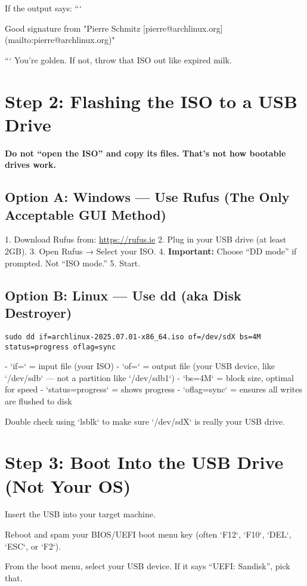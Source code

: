 \documentclass[12pt]{book}
\begin{document}
If the output says:
```

Good signature from "Pierre Schmitz [pierre@archlinux.org](mailto:pierre@archlinux.org)"

```
You're golden. If not, throw that ISO out like expired milk.

\section*{Step 2: Flashing the ISO to a USB Drive}

\textbf{Do not “open the ISO” and copy its files. That’s not how bootable drives work.}

\subsection*{Option A: Windows — Use Rufus (The Only Acceptable GUI Method)}

1. Download Rufus from: \url{https://rufus.ie}
2. Plug in your USB drive (at least 2GB).
3. Open Rufus → Select your ISO.
4. \textbf{Important:} Choose “DD mode” if prompted. Not “ISO mode.”
5. Start.

\subsection*{Option B: Linux — Use dd (aka Disk Destroyer)}

\begin{lstlisting}
sudo dd if=archlinux-2025.07.01-x86_64.iso of=/dev/sdX bs=4M status=progress oflag=sync
\end{lstlisting}

- `if=` = input file (your ISO)
- `of=` = output file (your USB device, like `/dev/sdb` — not a partition like `/dev/sdb1`)
- `bs=4M` = block size, optimal for speed
- `status=progress` = shows progress
- `oflag=sync` = ensures all writes are flushed to disk

Double check using `lsblk` to make sure `/dev/sdX` is really your USB drive.

\section*{Step 3: Boot Into the USB Drive (Not Your OS)}

Insert the USB into your target machine.

Reboot and spam your BIOS/UEFI boot menu key (often `F12`, `F10`, `DEL`, `ESC`, or `F2`).

From the boot menu, select your USB device. If it says “UEFI: Sandisk”, pick that.
\end{document}
